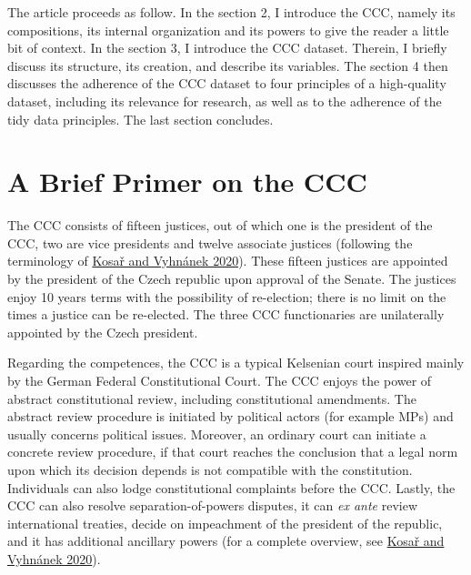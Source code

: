 \documentclass[
  11pt,
]{article}
\begin{document}
The article proceeds as follow. In the section 2, I introduce the CCC,
namely its compositions, its internal organization and its powers to
give the reader a little bit of context. In the section 3, I introduce
the CCC dataset. Therein, I briefly discuss its structure, its creation,
and describe its variables. The section 4 then discusses the adherence
of the CCC dataset to four principles of a high-quality dataset,
including its relevance for research, as well as to the adherence of the
tidy data principles. The last section concludes.

\hypertarget{a-brief-primer-on-the-ccc}{%
\section{A Brief Primer on the CCC}\label{a-brief-primer-on-the-ccc}}

The CCC consists of fifteen justices, out of which one is the president
of the CCC, two are vice presidents and twelve associate justices
(following the terminology of
\protect\hyperlink{ref-kosarConstitutionalCourtCzechia2020}{Kosař and
Vyhnánek 2020}). These fifteen justices are appointed by the president
of the Czech republic upon approval of the Senate. The justices enjoy 10
years terms with the possibility of re-election; there is no limit on
the times a justice can be re-elected. The three CCC functionaries are
unilaterally appointed by the Czech president.

Regarding the competences, the CCC is a typical Kelsenian court inspired
mainly by the German Federal Constitutional Court. The CCC enjoys the
power of abstract constitutional review, including constitutional
amendments. The abstract review procedure is initiated by political
actors (for example MPs) and usually concerns political issues.
Moreover, an ordinary court can initiate a concrete review procedure, if
that court reaches the conclusion that a legal norm upon which its
decision depends is not compatible with the constitution. Individuals
can also lodge constitutional complaints before the CCC. Lastly, the CCC
can also resolve separation-of-powers disputes, it can \emph{ex ante}
review international treaties, decide on impeachment of the president of
the republic, and it has additional ancillary powers (for a complete
overview, see
\protect\hyperlink{ref-kosarConstitutionalCourtCzechia2020}{Kosař and
Vyhnánek 2020}).
\end{document}
